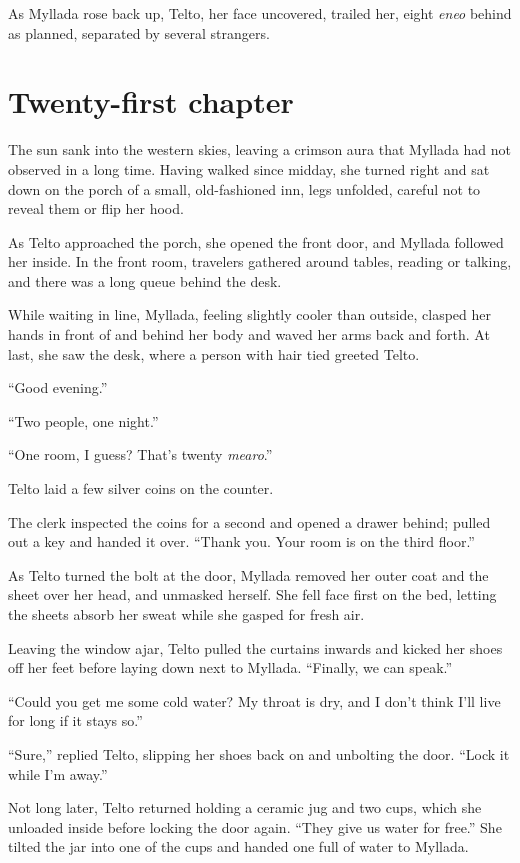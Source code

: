 As Myllada rose back up, Telto, her face uncovered, trailed her, eight \emph{eneo} behind as planned, separated by several strangers.

\chapter{Twenty-first chapter}

The sun sank into the western skies, leaving a crimson aura that Myllada had not observed in a long time. Having walked since midday, she turned right and sat down on the porch of a small, old-fashioned inn, legs unfolded, careful not to reveal them or flip her hood.

As Telto approached the porch, she opened the front door, and Myllada followed her inside. In the front room, travelers gathered around tables, reading or talking, and there was a long queue behind the desk.

While waiting in line, Myllada, feeling slightly cooler than outside, clasped her hands in front of and behind her body and waved her arms back and forth. At last, she saw the desk, where a person with hair tied greeted Telto.

``Good evening.''

``Two people, one night.''

``One room, I guess? That's twenty \emph{mearo}.''

Telto laid a few silver coins on the counter.

The clerk inspected the coins for a second and opened a drawer behind; pulled out a key and handed it over. ``Thank you. Your room is on the third floor.''

\centeredstars

As Telto turned the bolt at the door, Myllada removed her outer coat and the sheet over her head, and unmasked herself. She fell face first on the bed, letting the sheets absorb her sweat while she gasped for fresh air.

Leaving the window ajar, Telto pulled the curtains inwards and kicked her shoes off her feet before laying down next to Myllada. ``Finally, we can speak.''

``Could you get me some cold water? My throat is dry, and I don't think I'll live for long if it stays so.''

``Sure,'' replied Telto, slipping her shoes back on and unbolting the door. ``Lock it while I'm away.''

Not long later, Telto returned holding a ceramic jug and two cups, which she unloaded inside before locking the door again. ``They give us water for free.'' She tilted the jar into one of the cups and handed one full of water to Myllada.

